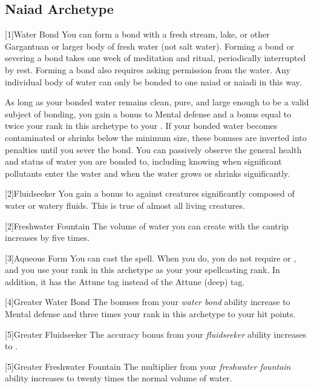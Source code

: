     \subsection{Naiad Archetype}

        [1]{Water Bond} You can form a bond with a fresh stream, lake, or other Gargantuan or larger body of fresh water (not salt water).
        Forming a bond or severing a bond takes one week of meditation and ritual, periodically interrupted by rest.
        Forming a bond also requires asking permission from the water.
        Any individual body of water can only be bonded to one naiad or naiadi in this way.

        As long as your bonded water remains clean, pure, and large enough to be a valid subject of bonding, you gain a  bonus to Mental defense and a bonus equal to twice your rank in this archetype to your .
        If your bonded water becomes contaminated or shrinks below the minimum size, these bonuses are inverted into penalties until you sever the bond.
        You can passively observe the general health and status of water you are bonded to, including knowing when significant pollutants enter the water and when the water grows or shrinks significantly.

        [2]{Fluidseeker} You gain a  bonus to  against creatures significantly composed of water or watery fluids.
        This is true of almost all living creatures.

        [2]{Freshwater Fountain} The volume of water you can create with the  cantrip increases by five times.

        [3]{Aqueous Form} You can cast the  spell.
        When you do, you do not require  or , and you use your rank in this archetype as your your spellcasting rank.
        In addition, it has the Attune tag instead of the Attune (deep) tag.

        [4]{Greater Water Bond} The bonuses from your \textit{water bond} ability increase to  Mental defense and three times your rank in this archetype to your hit points.

        [5]{Greater Fluidseeker} The accuracy bonus from your \textit{fluidseeker} ability increases to .

        [5]{Greater Freshwater Fountain} The multiplier from your \textit{freshwater fountain} ability increases to twenty times the normal volume of water.

